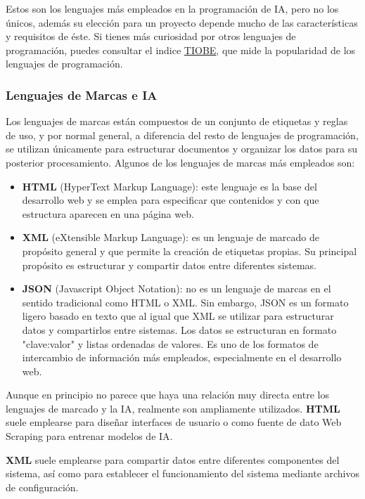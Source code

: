 Estos son los lenguajes más empleados en la programación de IA, pero no los únicos, además su elección para un proyecto depende mucho de las características y requisitos de éste. Si tienes más curiosidad por otros lenguajes de programación, puedes consultar el indice  \href{https://www.tiobe.com/tiobe-index/}{TIOBE}, que mide la popularidad de los lenguajes de programación. 

\subsubsection{Lenguajes de Marcas e IA}
Los lenguajes de marcas están compuestos de un conjunto de etiquetas y reglas de uso, y por normal general, a diferencia del resto de lenguajes de programación, se utilizan únicamente para estructurar documentos y organizar los datos para su posterior procesamiento. Algunos de los lenguajes de marcas más empleados son:

\begin{itemize}
	\item \textbf{HTML} (HyperText Markup Language): este lenguaje es la base del desarrollo web y se emplea para especificar que contenidos y con que estructura aparecen en una página web.
	\item \textbf{XML} (eXtensible Markup Language): es un lenguaje de marcado de propósito general y que permite la creación de etiquetas propias. Su principal propósito es estructurar y compartir datos entre diferentes sistemas.
	\item \textbf{JSON} (Javascript Object Notation): no es un lenguaje de marcas en el sentido tradicional como HTML o XML. Sin embargo, JSON es un formato ligero basado en texto que al igual que XML se utilizar para estructurar datos y compartirlos entre sistemas. Los datos se estructuran en formato "clave:valor" y listas ordenadas de valores. Es uno de los formatos de intercambio de información más empleados, especialmente en el desarrollo web.
\end{itemize}

Aunque en principio no parece que haya una relación muy directa entre los lenguajes de marcado y la IA, realmente son ampliamente utilizados. \textbf{HTML} suele emplearse para diseñar interfaces de usuario o como fuente de dato \gls{Web Scraping} para entrenar modelos de IA.

\textbf{XML} suele emplearse para compartir datos entre diferentes componentes del sistema, así como para establecer el funcionamiento del sistema mediante archivos de configuración.

